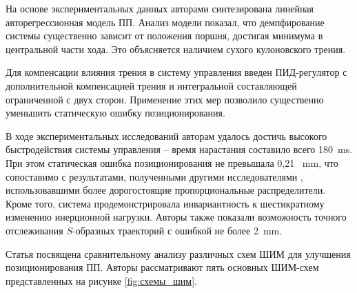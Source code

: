 На основе экспериментальных данных авторами синтезирована линейная авторегрессионная модель ПП.
Анализ модели показал, что демпфирование системы существенно зависит от положения поршня, достигая минимума в
центральной части хода. Это объясняется наличием сухого кулоновского трения.

Для компенсации влияния трения в систему управления введен ПИД-регулятор с дополнительной компенсацией
трения и интегральной составляющей ограниченной с двух сторон. Применение этих мер позволило существенно уменьшить статическую
ошибку позиционирования.

В ходе экспериментальных исследований авторам удалось достичь высокого быстродействия системы управления --
время нарастания составило всего 180~\si{\milli\second}. При этом статическая ошибка позиционирования не превышала 0,21~
\si{\milli\metre},
что сопоставимо с результатами, полученными другими исследователями
\cite*{Varseveld:article1,Varseveld:article2,Varseveld:article3,Surgenor1997ContinuousSM},
использовавшими более дорогостоящие
пропорциональные распределители. Кроме того, система продемонстрировала инвариантность к шестикратному изменению
инерционной нагрузки. Авторы также показали возможность точного отслеживания $S$-образных траекторий с ошибкой не
более 2~\si{\milli\metre}.

Статья \cite*{Shiee} посвящена сравнительному анализу различных схем ШИМ для улучшения позиционирования ПП. Авторы рассматривают пять
основных ШИМ-схем представленных на рисунке \ref*{fig:схемы_шим}.

